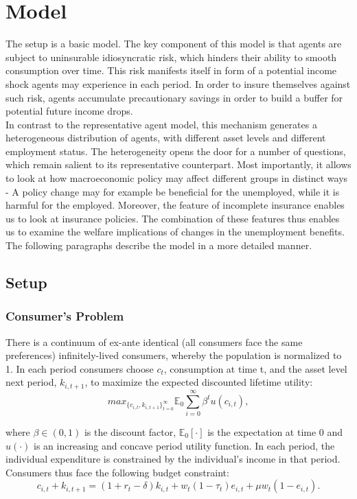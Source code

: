 \documentclass[a4paper,11pt]{article}
\begin{document}
\section{Model}

The setup is a basic \cite{aiyagari} model. The key component of this model is that agents are subject to uninsurable idiosyncratic risk, which hinders their ability to smooth consumption over time. This risk manifests itself in form of a potential income shock agents may experience in each period. In order to insure themselves against such risk, agents accumulate precautionary savings in order to build a buffer for potential future income drops. \\
In contrast to the representative agent model, this mechanism generates a heterogeneous distribution of agents, with different asset levels and different employment status. The heterogeneity opens the door for a number of questions, which remain salient to its representative counterpart. Most importantly, it allows to look at how macroeconomic policy may affect different groups in distinct ways - A policy change may for example be beneficial for the unemployed, while it is harmful for the employed. Moreover, the feature of incomplete insurance enables us to look at insurance policies. The combination of these features thus enables us to examine the welfare implications of changes in the unemployment benefits.\\
The following paragraphs describe the model in a more detailed manner. 


\subsection{Setup}

\subsubsection*{Consumer's Problem}
There is a continuum of ex-ante identical (all consumers face the same preferences) infinitely-lived consumers, whereby the population is normalized to 1. In each period consumers choose $ c_{t}$, consumption at time t, and the asset level next period, $k_{i,t+1}$, to maximize the expected discounted lifetime utility: 
\[ 
 max_{\{{ c_{i,t}, k_{i,t+1} }\}_{t = 0}^{\infty}} {\mathbb{E}_{0}} \sum_{i=0}^{\infty} \beta^{t}  u(c_{i,t}), 
 \]

where $\beta \in (0,1)$ is the discount factor, $\mathbb{E}_{0}[\cdot]$ is the expectation at time 0 and $u(\cdot)$ is an increasing and concave period utility function. In each period, the individual expenditure is constrained by the individual's income in that period. Consumers thus face the following budget constraint: 
  \begin{equation}
  \label{eq:budconstraint}
  c_{i,t} + k_{i,t+1} = (1 + r_{t} - \delta) k_{i,t} + w_{t} (1 - \tau_{t})  e_{i,t} + \mu w_{t} (1 - e_{i,t}).  \nonumber
  \end{equation} 
\end{document}
